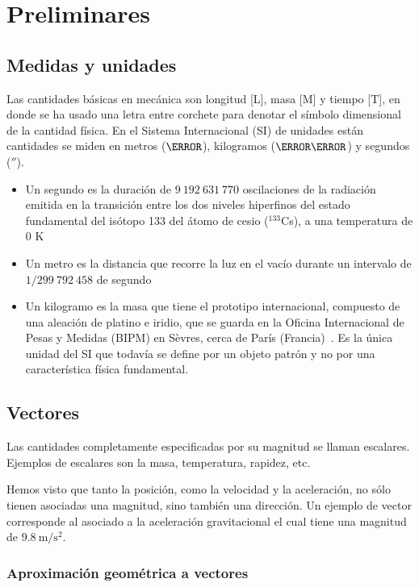 \chapter{Preliminares}

\section{Medidas y unidades}
Las cantidades básicas en mecánica son longitud [L], masa [M] y tiempo [T], en donde se ha usado una letra entre corchete para denotar el símbolo dimensional de la cantidad física. En el Sistema Internacional (SI) de unidades están cantidades se miden en metros ($\meter$), kilogramos ($\kilo\gram$) y segundos ($\second$).
\begin{itemize}
\item Un segundo es la duración de $9\ 192\ 631\ 770$ oscilaciones de la radiación emitida en la transición entre los dos niveles hiperfinos del estado fundamental del isótopo 133 del átomo de cesio (${}^{133}$Cs), a una temperatura de 0 K~\cite{wikipedia}
\item Un metro es la distancia que recorre la luz en el vacío durante un intervalo de $1/299\ 792\ 458$ de segundo~\cite{wikipedia}
\item Un kilogramo es la masa que tiene el prototipo internacional, compuesto de una aleación de platino e iridio, que se guarda en la Oficina Internacional de Pesas y Medidas (BIPM) en Sèvres, cerca de París (Francia)~\cite{wikipedia}.
Es la única unidad del SI que todavía se define por un objeto patrón y no por una característica física fundamental.
\end{itemize}





\section{Vectores}
\label{sec:vectores}

Las cantidades completamente especificadas por su magnitud se llaman escalares. Ejemplos de escalares son la masa, temperatura, rapidez, etc.

Hemos visto que tanto la posición, como la velocidad y la aceleración, no sólo tienen asociadas una magnitud, sino también una dirección. Un ejemplo de vector corresponde al asociado a la aceleración gravitacional el cual tiene una magnitud de $9.8\ \text{m}/\text{s}^2$.

\subsection{Aproximación geométrica a vectores}

